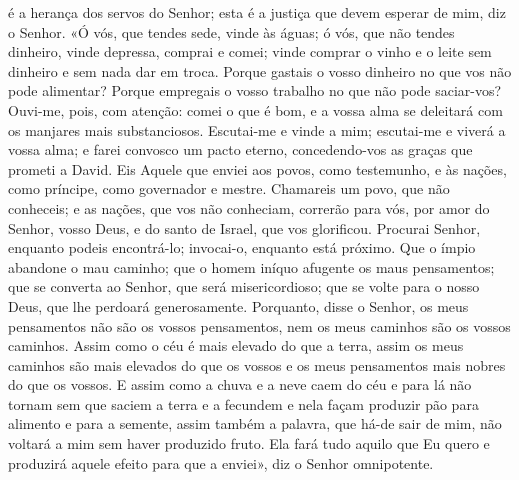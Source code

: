 \begin{paracol}{2}
{ é a herança dos servos do Senhor; esta é a justiça que devem esperar de mim, diz o Senhor. «Ó vós, que tendes sede, vinde às águas; ó vós, que não tendes dinheiro, vinde depressa, comprai e comei; vinde comprar o vinho e o leite sem dinheiro e sem nada dar em troca. Porque gastais o vosso dinheiro no que vos não pode alimentar? Porque empregais o vosso trabalho no que não pode saciar-vos? Ouvi-me, pois, com atenção: comei o que é bom, e a vossa alma se deleitará com os manjares mais substanciosos. Escutai-me e vinde a mim; escutai-me e viverá a vossa alma; e farei convosco um pacto eterno, concedendo-vos as graças que prometi a David. Eis Aquele que enviei aos povos, como testemunho, e às nações, como príncipe, como governador e mestre. Chamareis um povo, que não conheceis; e as nações, que vos não conheciam, correrão para vós, por amor do Senhor, vosso Deus, e do santo de Israel, que vos glorificou. Procurai Senhor, enquanto podeis encontrá-lo; invocai-o, enquanto está próximo. Que o ímpio abandone o mau caminho; que o homem iníquo afugente os maus pensamentos; que se converta ao Senhor, que será misericordioso; que se volte para o nosso Deus, que lhe perdoará generosamente. Porquanto, disse o Senhor, os meus pensamentos não são os vossos pensamentos, nem os meus caminhos são os vossos caminhos. Assim como o céu é mais elevado do que a terra, assim os meus caminhos são mais elevados do que os vossos e os meus pensamentos mais nobres do que os vossos. E assim como a chuva e a neve caem do céu e para lá não tornam sem que saciem a terra e a fecundem e nela façam produzir pão para alimento e para a semente, assim também a palavra, que há-de sair de mim, não voltará a mim sem haver produzido fruto. Ela fará tudo aquilo que Eu quero e produzirá aquele efeito para que a enviei», diz o Senhor omnipotente.
}\switchcolumn*{}\switchcolumn{}\switchcolumn*{}\switchcolumn{}\switchcolumn*{}\switchcolumn{}\switchcolumn*{}\switchcolumn{}\end{paracol}

